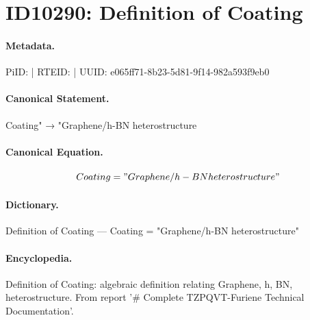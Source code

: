 \section*{ID10290: Definition of Coating}
\paragraph{Metadata.}
PiID:  | RTEID:  | UUID: e065ff71-8b23-5d81-9f14-982a593f9eb0

\paragraph{Canonical Statement.}
Coating" → "Graphene/h-BN heterostructure

\paragraph{Canonical Equation.}
\[
Coating = "Graphene/h-BN heterostructure"
\]

\paragraph{Dictionary.}
Definition of Coating — Coating = "Graphene/h-BN heterostructure"

\paragraph{Encyclopedia.}
Definition of Coating: algebraic definition relating Graphene, h, BN, heterostructure. From report '\# Complete TZPQVT-Furiene Technical Documentation'.
